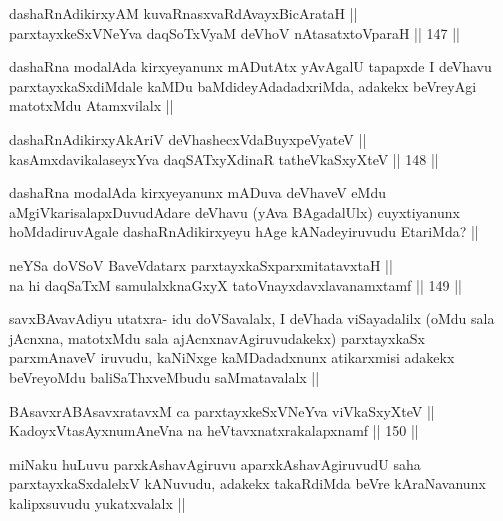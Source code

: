 \begin{shl}
dashaRnAdikirxyAM kuvaRnasxvaRdA\s vayxBicArataH || \\
parxtayxkeSxVNeYva daqSoTxV\s yaM deVhoV nAtasatxtoV\s paraH ||  147 ||  
\end{shl}

\begin{artha}
dashaRna modalAda kirxyeyanunx mADutAtx yAvAgalU tapapxde I deVhavu parxtayxkaSxdiMdale kaMDu baMdideyAdadadxriMda, adakekx beVreyAgi matotxMdu Atamxvilalx ||
\end{artha}


\begin{shl}
dashaRnAdikirxyAkAriV deVhashecxVdaBuyxpeVyateV || \\
kasAmxdavikalaseyxYva daqSATxyXdinaR tatheVkaSxyXteV ||  148 ||  
\end{shl}

\begin{artha}
dashaRna modalAda kirxyeyanunx mADuva deVhaveV eMdu aMgiVkarisalapxDuvudAdare deVhavu (yAva BAgadalUlx) cuyxtiyanunx hoMdadiruvAgale dashaRnAdikirxyeyu hAge kANadeyiruvudu EtariMda? ||
\end{artha}


\begin{shl}
neYSa doVSoV BaveVdatarx parxtayxkaSxparxmitatavxtaH || \\
na hi daqSaTxM samulalxknaGxyX tatoV\s nayxdavxlavanamxtamf ||  149 ||  
\end{shl}

\begin{artha}
savxBAvavAdiyu utatxra- idu doVSavalalx, I deVhada viSayadalilx (oMdu sala jAcnxna, matotxMdu sala ajAcnxnavAgiruvudakekx) parxtayxkaSx parxmAnaveV iruvudu, kaNiNxge kaMDadadxnunx atikarxmisi adakekx beVreyoMdu baliSaThxveMbudu saMmatavalalx ||
\end{artha}

\begin{shl}
BAsavxrABAsavxratavxM ca parxtayxkeSxVNeYva viVkaSxyXteV ||  \\
KadoyxVtasAyxnumAneVna na heVtavxnatxrakalapxnamf ||  150 ||  
\end{shl}

\begin{artha}
miNaku huLuvu parxkAshavAgiruvu aparxkAshavAgiruvudU saha parxtayxkaSxdalelxV kANuvudu, adakekx takaRdiMda beVre kAraNavanunx kalipxsuvudu yukatxvalalx ||
\end{artha}


